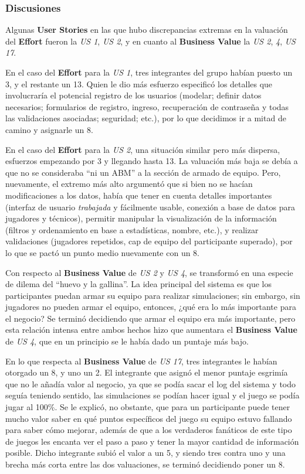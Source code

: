 \newpage

\subsubsection*{Discusiones}
Algunas \textbf{User Stories} en las que hubo discrepancias extremas en la valuación del \textbf{Effort} fueron la \emph{US 1}, \emph{US 2}, y en cuanto al \textbf{Business Value} la \emph{US 2}, \emph{4}, \emph{US 17}.

En el caso del \textbf{Effort} para la \emph{US 1}, tres integrantes del grupo habían puesto un 3, y el restante un 13. Quien le dio más esfuerzo especificó los detalles que involucraría el potencial registro de los usuarios (modelar; definir datos necesarios; formularios de registro, ingreso, recuperación de contraseña y todas las validaciones asociadas; seguridad; etc.), por lo que decidimos ir a mitad de camino y asignarle un 8.

En el caso del \textbf{Effort} para la \emph{US 2}, una situación similar pero más dispersa, esfuerzos empezando por 3 y llegando hasta 13. La valuación más baja se debía a que no se consideraba ``ni un ABM'' a la sección de armado de equipo. Pero, nuevamente, el extremo más alto argumentó que si bien no se hacían modificaciones a los datos, había que tener en cuenta detalles importantes (interfaz de usuario \emph{trabajada} y fácilmente usable, conexión a base de datos para jugadores y técnicos), permitir manipular la visualización de la información (filtros y ordenamiento en base a estadísticas, nombre, etc.), y realizar validaciones (jugadores repetidos, cap de equipo del participante superado), por lo que se pactó un punto medio nuevamente con un 8.

Con respecto al \textbf{Business Value} de \emph{US 2} y \emph{US 4}, se transformó en una especie de dilema del ``huevo y la gallina''. La idea principal del sistema es que los participantes puedan armar su equipo para realizar simulaciones; sin embargo, sin jugadores no pueden armar el equipo, entonces, ¿qué era lo más importante para el negocio? Se terminó decidiendo que armar el equipo era más importante, pero esta relación intensa entre ambos hechos hizo que aumentara el \textbf{Business Value} de \emph{US 4}, que en un principio se le había dado un puntaje más bajo.

En lo que respecta al \textbf{Business Value} de \emph{US 17}, tres integrantes le habían otorgado un 8, y uno un 2. El integrante que asignó el menor puntaje esgrimía que no le añadía valor al negocio, ya que se podía sacar el log del sistema y todo seguía teniendo sentido, las simulaciones se podían hacer igual y el juego se podía jugar al 100\%. Se le explicó, no obstante, que para un participante puede tener mucho valor saber en qué puntos específicos del juego su equipo estuvo fallando para saber cómo mejorar, además de que a los verdaderos fanáticos de este tipo de juegos les encanta ver el paso a paso y tener la mayor cantidad de información posible. Dicho integrante subió el valor a un 5, y siendo tres contra uno y una brecha más corta entre las dos valuaciones, se terminó decidiendo poner un 8.
